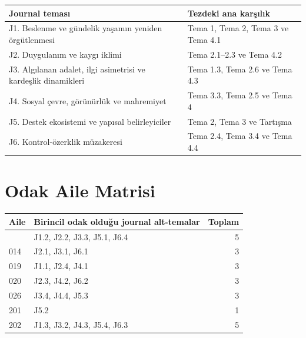 \documentclass[
  turkish,
  a4paper,
  DIV=11,
  numbers=noendperiod]{scrreprt}
\newcounter{none} %
\begin{document}
{\def\LTcaptype{none} %
\begin{longtable}[]{@{}
  >{\raggedright\arraybackslash}p{}
  >{\raggedright\arraybackslash}p{}@{}}
\toprule\noalign{}
\begin{minipage}[b]{\linewidth}\raggedright
Journal teması
\end{minipage} & \begin{minipage}[b]{\linewidth}\raggedright
Tezdeki ana karşılık
\end{minipage} \\
\midrule\noalign{}
\endhead
\bottomrule\noalign{}
\endlastfoot
J1. Beslenme ve gündelik yaşamın yeniden örgütlenmesi & Tema 1, Tema 2,
Tema 3 ve Tema 4.1 \\
J2. Duygulanım ve kaygı iklimi & Tema 2.1--2.3 ve Tema 4.2 \\
J3. Algılanan adalet, ilgi asimetrisi ve kardeşlik dinamikleri & Tema
1.3, Tema 2.6 ve Tema 4.3 \\
J4. Sosyal çevre, görünürlük ve mahremiyet & Tema 3.3, Tema 2.5 ve Tema
4 \\
J5. Destek ekosistemi ve yapısal belirleyiciler & Tema 2, Tema 3 ve
Tartışma \\
J6. Kontrol-özerklik müzakeresi & Tema 2.4, Tema 3.4 ve Tema 4.4 \\
\end{longtable}
}

\section{Odak Aile Matrisi}\label{odak-aile-matrisi}

{\def\LTcaptype{none} %
\begin{longtable}[]{@{}llr@{}}
\toprule\noalign{}
Aile & Birincil odak olduğu journal alt-temalar & Toplam \\
\midrule\noalign{}
\endhead
\bottomrule\noalign{}
\endlastfoot
011 & J1.2, J2.2, J3.3, J5.1, J6.4 & 5 \\
014 & J2.1, J3.1, J6.1 & 3 \\
019 & J1.1, J2.4, J4.1 & 3 \\
020 & J2.3, J4.2, J6.2 & 3 \\
026 & J3.4, J4.4, J5.3 & 3 \\
201 & J5.2 & 1 \\
202 & J1.3, J3.2, J4.3, J5.4, J6.3 & 5 \\
\end{longtable}
}
\end{document}
